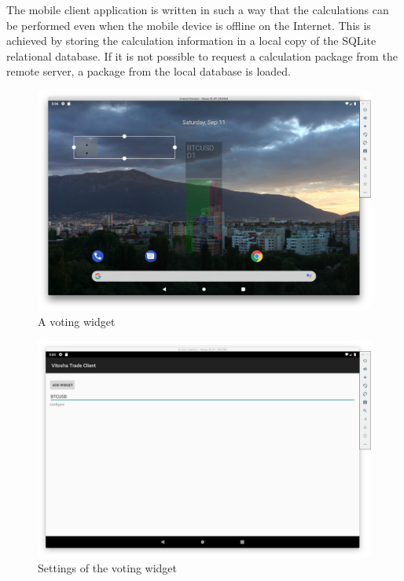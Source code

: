 \documentclass[a4paper,conference]{IEEEtran}
\begin{document}
The mobile client application is written in such a way that the calculations can be performed even when the mobile device is offline on the Internet. This is achieved by storing the calculation information in a local copy of the SQLite relational database. If it is not possible to request a calculation package from the remote server, a package from the local database is loaded. 

\begin{figure}[htbp]
\centerline{\includegraphics[width=1.0\linewidth]{fig07.png}}
\caption{A voting widget}
\label{fig07}
\end{figure}

\begin{figure}[htbp]
\centerline{\includegraphics[width=1.0\linewidth]{fig08.png}}
\caption{Settings of the voting widget}
\label{fig08}
\end{figure}
\end{document}
